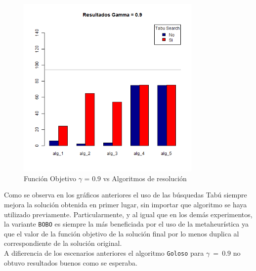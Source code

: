 \begin{figure}[H]
  \centering
    \includegraphics[width=0.8\textwidth]{resultados/affiliations/Graficos_agrupados/gamma09-affiliations.png}
  \caption{Función Objetivo $\gamma$ = $0.9$ vs Algoritmos de resolución}
  \label{res:img-affiliations-agr-gamma09}
\end{figure}

Como se observa en los gráficos anteriores el uso de las búsquedas Tabú siempre mejora la solución obtenida en primer lugar, sin importar que algoritmo se haya utilizado previamente. Particularmente, y al igual que en los demás experimentos, la variante \texttt{BOBO} es siempre la más beneficiada por el uso de la metaheurística ya que el valor de la función objetivo de la solución final por lo menos duplica al correspondiente de la solución original.\\

A difierencia de los escenarios anteriores el algoritmo \texttt{Goloso} para $\gamma\ =\ 0.9$ no obtuvo resultados buenos como se esperaba.
\newpage
